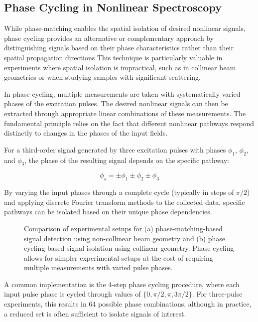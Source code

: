 \subsection{Phase Cycling in Nonlinear Spectroscopy}
\label{subsec:phase_cycling}

\noindent While phase-matching enables the spatial isolation of desired nonlinear signals, phase cycling provides an alternative or complementary approach by distinguishing signals based on their phase characteristics rather than their spatial propagation directions %
This technique is particularly valuable in experiments where spatial isolation is impractical, such as in collinear beam geometries or when studying samples with significant scattering.

\noindent In phase cycling, multiple measurements are taken with systematically varied phases of the excitation pulses. The desired nonlinear signals can then be extracted through appropriate linear combinations of these measurements. The fundamental principle relies on the fact that different nonlinear pathways respond distinctly to changes in the phases of the input fields.

\noindent For a third-order signal generated by three excitation pulses with phases $\phi_1$, $\phi_2$, and $\phi_3$, the phase of the resulting signal depends on the specific pathway:

\begin{equation}
	\phi_s = \pm\phi_1 \pm\phi_2 \pm\phi_3
	\label{eq:phase_cycling}
\end{equation}

\noindent By varying the input phases through a complete cycle (typically in steps of $\pi/2$) and applying discrete Fourier transform methods to the collected data, specific pathways can be isolated based on their unique phase dependencies.

\begin{figure}[ht]
	\centering
	\caption{Comparison of experimental setups for (a) phase-matching-based signal detection using non-collinear beam geometry and (b) phase cycling-based signal isolation using collinear geometry. Phase cycling allows for simpler experimental setups at the cost of requiring multiple measurements with varied pulse phases.}
	\label{fig:phase_cycling_vs_matching}
\end{figure}

\noindent A common implementation is the 4-step phase cycling procedure, where each input pulse phase is cycled through values of $\{0, \pi/2, \pi, 3\pi/2\}$. For three-pulse experiments, this results in 64 possible phase combinations, although in practice, a reduced set is often sufficient to isolate signals of interest.

